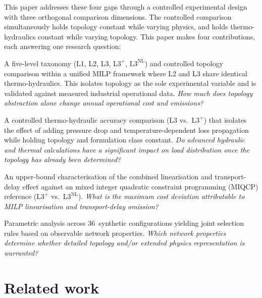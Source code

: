 \documentclass[a4paper,fleqn]{cas-dc}
\newcommand{\Lplus}{\mathrm{L3}^{+}}
\newcommand{\Lnl}{\mathrm{L3}^{\mathrm{NL}}}
\begin{document}
This paper addresses these four gaps through a controlled
experimental design with three orthogonal comparison dimensions.
The controlled comparison simultaneously holds topology
constant while varying physics, and holds thermo-hydraulics constant while
varying topology. This paper makes four contributions, each answering one
research question:
%
\begin{description}[style=nextline, nosep, leftmargin=1.5em]
  \item[Contribution 1 / RQ1 Topology effect:]
    A five-level taxonomy (L1, L2, L3, $\Lplus$, $\Lnl$) and controlled topology comparison within a unified MILP
    framework where L2 and L3 share identical thermo-hydraulics. This
    isolates topology as the sole experimental variable and is
    validated against measured industrial operational data.
    \emph{How much does topology abstraction alone change annual
    operational cost and  emissions?}

  \item[Contribution 2 / RQ2 thermo-hydraulic effect:]
    A controlled thermo-hydraulic accuracy comparison (L3 vs.\ $\Lplus$)
    that isolates the effect of adding pressure drop and
    temperature-dependent loss propagation while holding topology
    and formulation class constant.
    \emph{Do advanced hydraulic and thermal calculations
    have a significant impact on load distribution once the topology has already been determined?}

  \item[Contribution 3 / RQ3 Linearisation error bounds:]
    An upper-bound characterisation of the combined linearisation
    and transport-delay effect against an mixed integer quadratic constraint programming (MIQCP) reference
    ($\Lplus$ vs.\ $\Lnl$).
    \emph{What is the maximum cost deviation attributable to MILP
    linearisation and transport-delay omission?}

  \item[Contribution 4 / RQ4 Generalisability:]
    Parametric analysis across 36~synthetic configurations
    yielding joint selection rules based on observable network
    properties.
    \emph{Which network properties determine whether detailed
    topology and/or extended physics representation is warranted?}
\end{description}

\section{Related work}
\label{sec:related_work}
\end{document}
